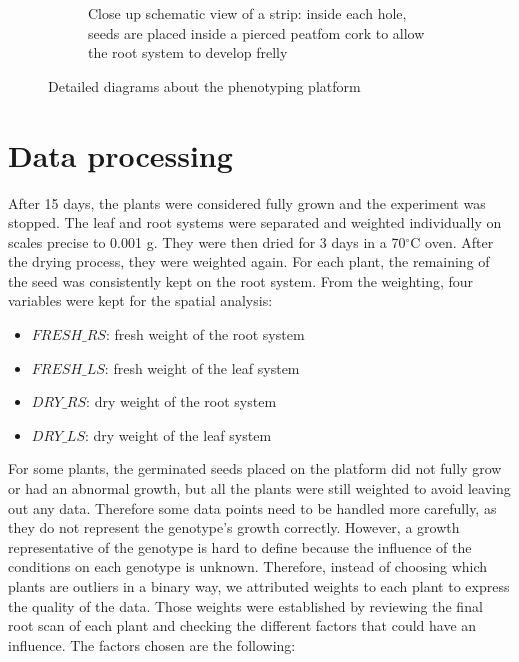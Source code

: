 \begin{figure}[!htb]
\begin{subfigure}[b]{0.475\textwidth}
            \caption{Close up schematic view of a strip: inside each hole, seeds are placed inside a pierced peatfom cork to allow the root system to develop frelly}    
            \label{fig:seed_platform_close_up}
        \end{subfigure}
        \caption{Detailed diagrams about the phenotyping platform}
    \end{figure}


\section{Data processing}
After 15 days, the plants were considered fully grown and the experiment was stopped. The leaf and root systems were separated and weighted individually on scales precise to 0.001 g. They were then dried for 3 days in a 70$^{\circ}$C oven. After the drying process, they were weighted again. For each plant, the remaining of the seed was consistently kept on the root system.
From the weighting, four variables were kept for the spatial analysis:

\begin{itemize}
\item $FRESH\_RS$: fresh weight of the root system
\item $FRESH\_LS$: fresh weight of the leaf system
\item $DRY\_RS$: dry weight of the root system
\item $DRY\_LS$: dry weight of the leaf system
\end{itemize} 

%
For some plants, the germinated seeds placed on the platform did not fully grow or had an abnormal growth, but all the plants were still weighted to avoid leaving out any data. Therefore some data points need to be handled more carefully, as they do not represent the genotype's growth correctly. However, a  growth representative of the genotype is hard to define because the influence of the conditions on each genotype is unknown. Therefore, instead of choosing which plants are outliers in a binary way, we attributed weights to each plant to express the quality of the data. Those weights were established by reviewing the final root scan of each plant and checking the different factors that could have an influence. The factors chosen are the following:

